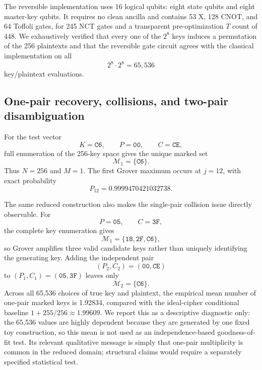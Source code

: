 \documentclass[pdflatex,sn-nature]{sn-jnl}
\theoremstyle{thmstyleone}
\theoremstyle{thmstyletwo}
\begin{document}
The reversible implementation uses 16 logical qubits: eight state qubits and eight master-key qubits.  It requires no clean ancilla and contains 53 X, 128 CNOT, and 64 Toffoli gates, for 245 NCT gates and a transparent pre-optimization $T$ count of 448.  We exhaustively verified that every one of the $2^8$ keys induces a permutation of the 256 plaintexts and that the reversible gate circuit agrees with the classical implementation on all
\begin{equation}
    2^8\cdot2^8=65{,}536
\end{equation}
key/plaintext evaluations.

\subsection{One-pair recovery, collisions, and two-pair disambiguation}
For the test vector
\begin{equation}
    K=\mathtt{C6},\qquad P=\mathtt{00},\qquad C=\mathtt{CE},
\end{equation}
full enumeration of the 256-key space gives the unique marked set
\begin{equation}
    \mathcal{M}_1=\{\mathtt{C6}\}.
\end{equation}
Thus $N=256$ and $M=1$.  The first Grover maximum occurs at $j=12$, with exact probability
\begin{equation}
    P_{12}=0.9999470421032738.
\end{equation}

The same reduced construction also makes the single-pair collision issue directly observable.  For
\begin{equation}
    P=\mathtt{05},\qquad C=\mathtt{3F},
\end{equation}
the complete key enumeration gives
\begin{equation}
    \mathcal{M}_1=\{\mathtt{18},\mathtt{2F},\mathtt{C6}\},
\end{equation}
so Grover amplifies three valid candidate keys rather than uniquely identifying the generating key.  Adding the independent pair
\begin{equation}
    (P_2,C_2)=(\mathtt{00},\mathtt{CE})
\end{equation}
to $(P_1,C_1)=(\mathtt{05},\mathtt{3F})$ leaves only
\begin{equation}
    \mathcal{M}_2=\{\mathtt{C6}\}.
\end{equation}
Across all 65,536 choices of true key and plaintext, the empirical mean number of one-pair marked keys is 1.92834, compared with the ideal-cipher conditional baseline $1+255/256\approx1.99609$. We report this as a descriptive diagnostic only: the 65,536 values are highly dependent because they are generated by one fixed toy construction, so this mean is not used as an independence-based goodness-of-fit test. Its relevant qualitative message is simply that one-pair multiplicity is common in the reduced domain; structural claims would require a separately specified statistical test.
\end{document}
